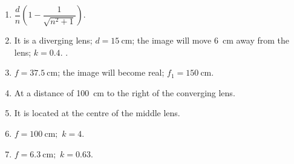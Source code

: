 \documentclass[a4paper,sfsidenotes]{tufte-book}
\begin{document}
\begin{enumerate}[label=\arabic*.]
\item $\dfrac{d}{n} \left( 1 - \dfrac{1}{\sqrt{n^{2}+1}}\right).$
\item It is a diverging lens; $d= \SI{15}{\centi\metre}$; the image will move \SI{6}{\centi\metre} away
from the lens; $k = 0.4$.
.
\item $f = \SI{37.5}{\centi\metre}$; the image will become real; $f_{1} = \SI{150}{\centi\metre}$.
\item At a distance of \SI{100}{\centi\metre} to the right of the converging lens.
\item It is located at the centre of the middle lens.
\item $f=\SI{100}{\centi\metre}; \,\, k=4$.
\item $f = \SI{6.3}{\centi\metre}; \,\,k = 0.63$.
\end{enumerate}
    
\end{document}
